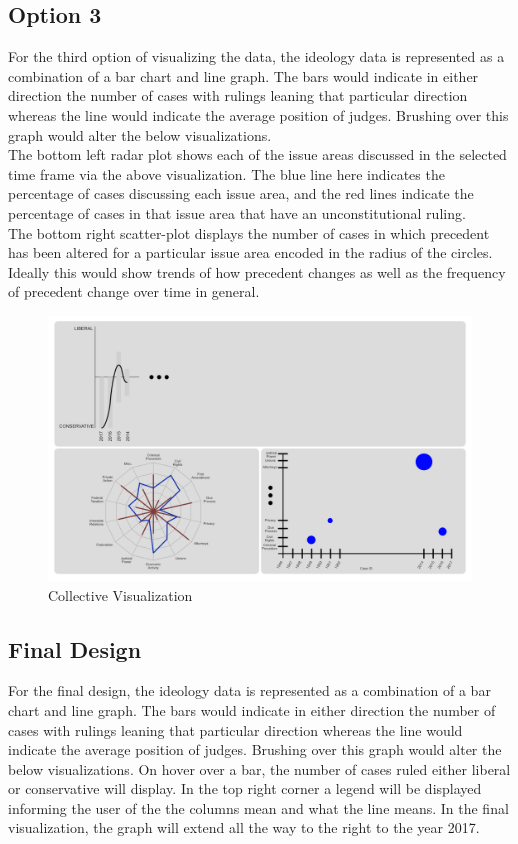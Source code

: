 \documentclass{article}
\begin{document}
\subsection{Option 3}
For the third option of visualizing the data, the ideology data is represented as a combination of a bar chart and line graph. The bars would indicate in either direction the number of cases with rulings leaning that particular direction whereas the line would indicate the average position of judges. Brushing over this graph would alter the below visualizations.\\

The bottom left radar plot shows each of the issue areas discussed in the selected time frame via the above visualization. The blue line here indicates the percentage of cases discussing each issue area, and the red lines indicate the percentage of cases in that issue area that have an unconstitutional ruling.\\

The bottom right scatter-plot displays the number of cases in which precedent has been altered for a particular issue area encoded in the radius of the circles. Ideally this would show trends of how precedent changes as well as the frequency of precedent change over time in general. 
\begin{figure}[h!]
  \includegraphics[width=\linewidth]{pics/Design3.png}
  \caption{Collective Visualization}
  \label{fig:collectiveVis}
\end{figure}
\FloatBarrier

\subsection{Final Design}
For the final design, the ideology data is represented as a combination of a bar chart and line graph. The bars would indicate in either direction the number of cases with rulings leaning that particular direction whereas the line would indicate the average position of judges. Brushing over this graph would alter the below visualizations. On hover over a bar, the number of cases ruled either liberal or conservative will display. In the top right corner a legend will be displayed informing the user of the the columns mean and what the line means. In the final visualization, the graph will extend all the way to the right to the year 2017.\\
\end{document}
